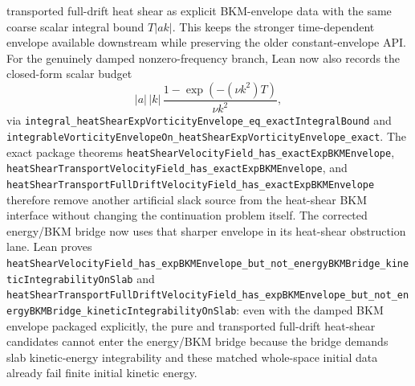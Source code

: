 \documentclass[11pt]{article}
\theoremstyle{remark}
\begin{document}
transported full-drift heat shear as explicit BKM-envelope data with the same
coarse scalar integral bound \(T|ak|\).  This keeps the stronger time-dependent
envelope available downstream while preserving the older constant-envelope API.
For the genuinely damped nonzero-frequency branch, Lean now also records the
closed-form scalar budget
\[
  |a|\,|k|\,\frac{1-\exp(-(\nu k^2)T)}{\nu k^2},
\]
via
\texttt{integral\_heatShearExpVorticityEnvelope\_eq\_exactIntegralBound} and
\texttt{integrableVorticityEnvelopeOn\_heatShearExpVorticityEnvelope\_exact}.
The exact package theorems
\texttt{heatShearVelocityField\_has\_exactExpBKMEnvelope},
\texttt{heatShearTransportVelocityField\_has\_exactExpBKMEnvelope}, and
\texttt{heatShearTransportFullDriftVelocityField\_has\_exactExpBKMEnvelope}
therefore remove another artificial slack source from the heat-shear BKM
interface without changing the continuation problem itself.
The corrected energy/BKM bridge now uses that sharper envelope in its heat-shear
obstruction lane.  Lean proves
\texttt{heatShearVelocityField\_has\_expBKMEnvelope\_but\_not\_energyBKMBridge\_kineticIntegrabilityOnSlab}
and
\texttt{heatShearTransportFullDriftVelocityField\_has\_expBKMEnvelope\_but\_not\_energyBKMBridge\_kineticIntegrabilityOnSlab}:
even with the damped BKM envelope packaged explicitly, the pure and transported
full-drift heat-shear candidates cannot enter the energy/BKM bridge because the
bridge demands slab kinetic-energy integrability and these matched whole-space
initial data already fail finite initial kinetic energy.
\end{document}

